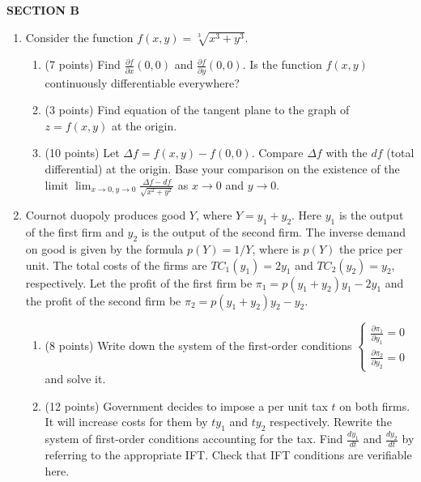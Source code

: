 \documentclass[12pt]{article} %
\theoremstyle{definition} %
\begin{document}
\textbf{SECTION B}

\begin{enumerate}[resume]


\item Consider the function  $f(x, y) = \sqrt[3]{x^3 + y^3}$.

\begin{enumerate}

\item (7 points) Find $\frac{\partial f}{\partial x}(0,0)$ and $\frac{\partial f}{\partial y}(0,0)$. Is the function $f(x, y)$ continuously differentiable everywhere?
\item (3 points) Find equation of the tangent plane to the graph of $z= f(x,y)$ at the origin.

\item (10 points) Let $\Delta f = f(x,y) - f(0,0)$. Compare $\Delta f$ with the $df$ (total differential) at
the origin. Base your comparison on the existence of the limit $\lim_{x\to0, y\to 0} \frac{\Delta f - df}{\sqrt{x^2 + y^2}}$ as $x\to 0$ and $y\to 0$.
\end{enumerate}

\item Cournot duopoly produces good $Y$, where $Y=y_1 + y_2$. Here $y_1$ is the output of the
first firm and $y_2$ is the output of the second firm. The inverse demand on
good is given by the formula $p(Y)=1/Y$, where is $p(Y)$ the price per unit. The total
costs of the firms are $TC_1(y_1) = 2y_1$ and $TC_2(y_2) = y_2$, respectively. Let the profit of the first
firm be $\pi_1 = p(y_1 + y_2)y_1 - 2y_1$ and the profit of the second firm be $\pi_2 = p(y_1 + y_2)y_2 - y_2$.

\begin{enumerate}
\item (8 points) Write down the system of the first-order
conditions $\begin{cases} \frac{\partial \pi_1}{\partial y_1} =0 \\  \frac{\partial \pi_2}{\partial y_2} =0 \end{cases}$ and solve it.
\item (12 points) Government decides to impose a per unit tax $t$ on
both firms. It will increase costs for them by $ty_1$ and $ty_2$ respectively. Rewrite the system
of first-order conditions accounting for the tax. Find $\frac{dy_1}{dt}$ and $\frac{dy_2}{dt}$ by referring to the
appropriate IFT. Check that IFT conditions are verifiable here.
\end{enumerate}


\end{enumerate}
\end{document}
